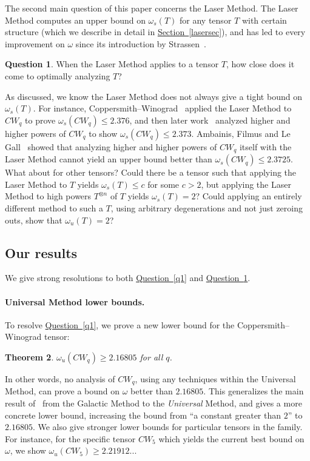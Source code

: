 \documentclass[11pt]{article}
\numberwithin{equation}{section}
\newtheorem{theorem}{Theorem}[section]
\theoremstyle{definition}
\newtheorem{question}[theorem]{Question}
\theoremstyle{plain}
\newcommand{\expref}[2]{\hyperref[#2]{#1~\ref{#2}}}
\theoremstyle{definition}
\begin{document}
The second main question of this paper concerns the Laser Method. 
The Laser Method
%
computes an upper bound on  %
$\omega_s(T)$ for any tensor $T$ with certain structure (which we describe in detail in \expref{Section}{lasersec}), and has led to every improvement on $\omega$ since its introduction by Strassen~\cite{strassenlaser1}.
\begin{question}\label{q2}
When the Laser Method applies to a tensor $T$, how close does it come to optimally analyzing $T$?
\end{question}
As discussed, we know the Laser Method does not always give a tight bound on $\omega_s(T)$. For instance, Coppersmith--Winograd~\cite{coppersmith} applied the Laser Method to $CW_q$ to prove $\omega_s(CW_q) \leq 2.376$, and then 
%
later work~\cite{stothers,v12,legall,awrefined}
analyzed higher and higher powers of $CW_q$ to show $\omega_s(CW_q) \leq 2.373$. Ambainis, Filmus and Le Gall~\cite{ambainis} showed that analyzing higher and higher powers of $CW_q$ itself with the Laser Method cannot yield an upper bound better than $\omega_s(CW_q) \leq 2.3725$. What about for other tensors? Could there be a tensor such that applying the Laser Method to $T$ yields $\omega_s(T) \leq c$ for some $c > 2$, but applying the Laser Method to high powers $T^{\otimes n}$ of $T$ yields $\omega_s(T) = 2$? Could applying an entirely different method to such a $T$, using arbitrary degenerations and not just zeroing outs, show that $\omega_u(T) = 2$?

%
\subsection{Our results}

We give strong resolutions to both \expref{Question}{q1} and \expref{Question}{q2}.

%
\paragraph{Universal Method lower bounds.}
To resolve \expref{Question}{q1}, we prove a new lower bound for the Coppersmith--Winograd tensor:

\begin{theorem} \label{mainthm}
$\omega_u(CW_q) \geq 2.16805$ for all $q$.
\end{theorem}

In other words, no analysis of $CW_q$, using any techniques within the Universal Method, can prove a bound on $\omega$ better than $2.16805$. This generalizes the main result of~\cite{aw} from the Galactic Method to the \emph{Universal} Method, and gives a more concrete lower bound, increasing the bound from ``a constant greater than $2$'' to $2.16805$. We also give stronger lower bounds for particular tensors in the family. For instance, for the specific tensor $CW_5$ which yields the current best bound on $\omega$, we show $\omega_u(CW_5) \geq 2.21912...$
\end{document}
